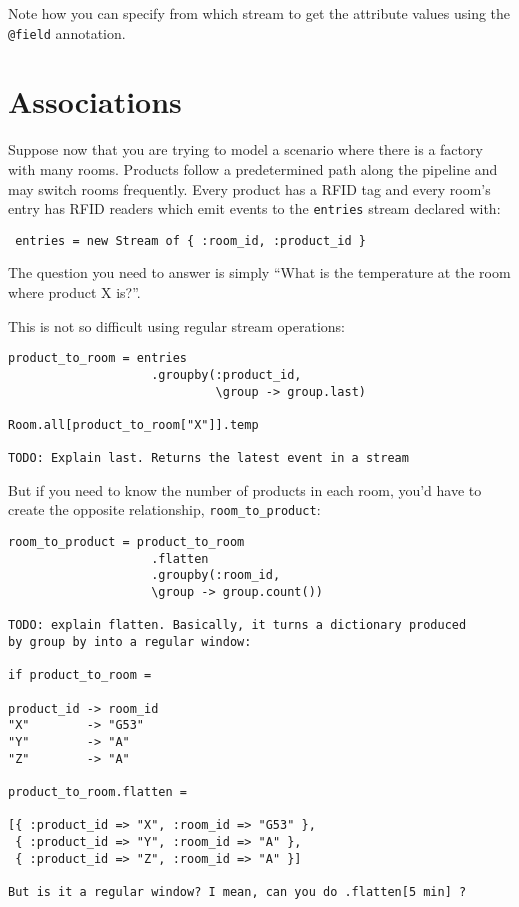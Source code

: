 \documentclass{report}
\begin{document}
Note how you can specify from which stream to get the attribute values
using the \verb=@field= annotation.

\section{Associations}
\label{sec:associations}

Suppose now that you are trying to model a scenario where there is a
factory with many rooms. Products follow a predetermined path along
the pipeline and may switch rooms frequently. Every product has a
RFID tag and every room's entry has RFID readers which emit events to
the \verb=entries= stream declared with:

\begin{verbatim}
 entries = new Stream of { :room_id, :product_id }
\end{verbatim}

The question you need to answer is simply ``What is the temperature at
the room where product X is?''.

This is not so difficult using regular stream operations:

\begin{verbatim}
product_to_room = entries
                    .groupby(:product_id,
                             \group -> group.last)

Room.all[product_to_room["X"]].temp

TODO: Explain last. Returns the latest event in a stream
\end{verbatim}

But if you need to know the number of products in each room, you'd
have to create the opposite relationship, \verb=room_to_product=:

\begin{verbatim}
room_to_product = product_to_room
                    .flatten
                    .groupby(:room_id,
                    \group -> group.count())

TODO: explain flatten. Basically, it turns a dictionary produced
by group by into a regular window:

if product_to_room =

product_id -> room_id
"X"        -> "G53"
"Y"        -> "A"
"Z"        -> "A"

product_to_room.flatten =

[{ :product_id => "X", :room_id => "G53" },
 { :product_id => "Y", :room_id => "A" },
 { :product_id => "Z", :room_id => "A" }]

But is it a regular window? I mean, can you do .flatten[5 min] ?

\end{verbatim}
\end{document}
